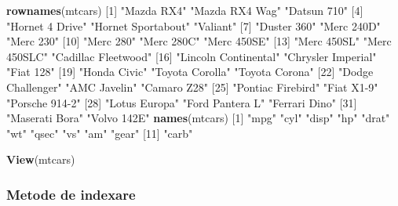 \documentclass[]{article}
\newenvironment{Shaded}{\begin{snugshade}}{\end{snugshade}}
\newcommand{\KeywordTok}[1]{\textcolor[rgb]{0.13,0.29,0.53}{\textbf{#1}}}
\newcommand{\DecValTok}[1]{\textcolor[rgb]{0.00,0.00,0.81}{#1}}
\newcommand{\StringTok}[1]{\textcolor[rgb]{0.31,0.60,0.02}{#1}}
\newcommand{\NormalTok}[1]{#1}
\begin{document}
\begin{Shaded}
\begin{Highlighting}[]
\KeywordTok{rownames}\NormalTok{(mtcars)}
\NormalTok{ [}\DecValTok{1}\NormalTok{] }\StringTok{"Mazda RX4"}           \StringTok{"Mazda RX4 Wag"}       \StringTok{"Datsun 710"}         
\NormalTok{ [}\DecValTok{4}\NormalTok{] }\StringTok{"Hornet 4 Drive"}      \StringTok{"Hornet Sportabout"}   \StringTok{"Valiant"}            
\NormalTok{ [}\DecValTok{7}\NormalTok{] }\StringTok{"Duster 360"}          \StringTok{"Merc 240D"}           \StringTok{"Merc 230"}           
\NormalTok{[}\DecValTok{10}\NormalTok{] }\StringTok{"Merc 280"}            \StringTok{"Merc 280C"}           \StringTok{"Merc 450SE"}         
\NormalTok{[}\DecValTok{13}\NormalTok{] }\StringTok{"Merc 450SL"}          \StringTok{"Merc 450SLC"}         \StringTok{"Cadillac Fleetwood"} 
\NormalTok{[}\DecValTok{16}\NormalTok{] }\StringTok{"Lincoln Continental"} \StringTok{"Chrysler Imperial"}   \StringTok{"Fiat 128"}           
\NormalTok{[}\DecValTok{19}\NormalTok{] }\StringTok{"Honda Civic"}         \StringTok{"Toyota Corolla"}      \StringTok{"Toyota Corona"}      
\NormalTok{[}\DecValTok{22}\NormalTok{] }\StringTok{"Dodge Challenger"}    \StringTok{"AMC Javelin"}         \StringTok{"Camaro Z28"}         
\NormalTok{[}\DecValTok{25}\NormalTok{] }\StringTok{"Pontiac Firebird"}    \StringTok{"Fiat X1-9"}           \StringTok{"Porsche 914-2"}      
\NormalTok{[}\DecValTok{28}\NormalTok{] }\StringTok{"Lotus Europa"}        \StringTok{"Ford Pantera L"}      \StringTok{"Ferrari Dino"}       
\NormalTok{[}\DecValTok{31}\NormalTok{] }\StringTok{"Maserati Bora"}       \StringTok{"Volvo 142E"}         
\KeywordTok{names}\NormalTok{(mtcars)}
\NormalTok{ [}\DecValTok{1}\NormalTok{] }\StringTok{"mpg"}  \StringTok{"cyl"}  \StringTok{"disp"} \StringTok{"hp"}   \StringTok{"drat"} \StringTok{"wt"}   \StringTok{"qsec"} \StringTok{"vs"}   \StringTok{"am"}   \StringTok{"gear"}
\NormalTok{[}\DecValTok{11}\NormalTok{] }\StringTok{"carb"}
\end{Highlighting}
\end{Shaded}

\begin{Shaded}
\begin{Highlighting}[]
\KeywordTok{View}\NormalTok{(mtcars) }
\end{Highlighting}
\end{Shaded}

\subsubsection{Metode de indexare}\label{metode-de-indexare}
\end{document}
